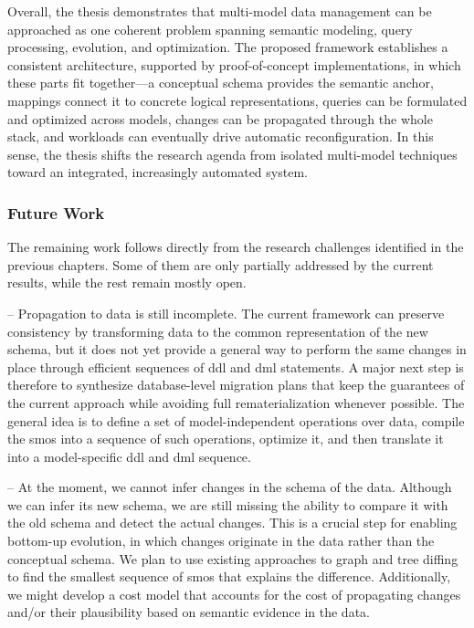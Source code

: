 \noindent Overall, the thesis demonstrates that multi-model data management can be approached as one coherent problem spanning semantic modeling, query processing, evolution, and optimization. The proposed framework establishes a consistent architecture, supported by proof-of-concept implementations, in which these parts fit together---a conceptual schema provides the semantic anchor, mappings connect it to concrete logical representations, queries can be formulated and optimized across models, changes can be propagated through the whole stack, and workloads can eventually drive automatic reconfiguration. In this sense, the thesis shifts the research agenda from isolated multi-model techniques toward an integrated, increasingly automated system.

\subsubsection{Future Work}

The remaining work follows directly from the research challenges identified in the previous chapters. Some of them are only partially addressed by the current results, while the rest remain mostly open.

 -- Propagation to data is still incomplete. The current framework can preserve consistency by transforming data to the common representation of the new schema, but it does not yet provide a general way to perform the same changes in place through efficient sequences of \acrshort{ddl} and \acrshort{dml} statements. A major next step is therefore to synthesize database-level migration plans that keep the guarantees of the current approach while avoiding full rematerialization whenever possible. The general idea is to define a set of model-independent operations over data, compile the \acrshort{smo}s into a sequence of such operations, optimize it, and then translate it into a model-specific \acrshort{ddl} and \acrshort{dml} sequence.

 -- At the moment, we cannot infer changes in the schema of the data. Although we can infer its new schema, we are still missing the ability to compare it with the old schema and detect the actual changes. This is a crucial step for enabling bottom-up evolution, in which changes originate in the data rather than the conceptual schema. We plan to use existing approaches to graph and tree diffing~\citep{gao2010survey, chawathe1996change} to find the smallest sequence of \acrshort{smo}s that explains the difference. Additionally, we might develop a cost model that accounts for the cost of propagating changes and/or their plausibility based on semantic evidence in the data.

